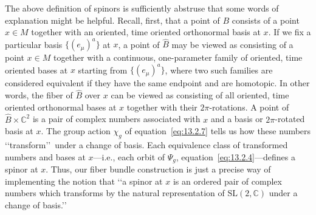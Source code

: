 The above definition of spinors is sufficiently abstruse that some words of
explanation might be helpful. Recall, first, that a point of \(B\) consists of a
point \(x\in M\) together with an oriented, time oriented orthonormal basis at \(x\).
If we fix a particular basis \(\{(e_\mu)^a\}\) at \(x\), a point of \(\widehat B\) may
be viewed as consisting of a point \(x\in M\) together with a continuous,
one-parameter family of oriented, time oriented bases at \(x\) starting from
\(\{(e_\mu)^a\}\), where two such families are considered equivalent if they have the
same endpoint and are homotopic. In other words, the fiber of \(\widehat B\) over
\(x\) can be viewed as consisting of all oriented, time oriented orthonormal bases
at \(x\) together with their \(2\pi\)-rotations. A point of
\(\widehat B\times\mathbb C^2\) is a pair of complex numbers associated with \(x\)
and a basis or \(2\pi\)-rotated basis at \(x\). The group action \(\chi_g\) of
equation~\eqref{eq:13.2.7} tells us how these numbers
\lq\lq transform\rq\rq\ under a change of basis. Each equivalence class of
transformed numbers and bases at \(x\)---i.e., each orbit of \(\Psi_g\),
equation~\eqref{eq:13.2.4}---defines a spinor at \(x\). Thus, our fiber bundle
construction is just a precise way of implementing the notion that \lq\lq a spinor at
\(x\) is an ordered pair of complex numbers which transforms by the natural
representation of \(\mathrm{SL}(2,\mathbb C)\) under a change of basis.\rq\rq\

